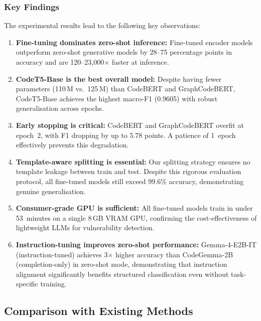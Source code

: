 \documentclass[conference]{IEEEtran}
\begin{document}
\subsubsection{Key Findings}
The experimental results lead to the following key observations:
\begin{enumerate}
    \item \textbf{Fine-tuning dominates zero-shot inference:}
          Fine-tuned encoder models outperform zero-shot generative models by
          28--75 percentage points in accuracy and are 120--23,000$\times$
          faster at inference.
    \item \textbf{CodeT5-Base is the best overall model:}
          Despite having fewer parameters (110\,M vs.\ 125\,M) than
          CodeBERT and GraphCodeBERT, CodeT5-Base achieves the highest
          macro-F1 (0.9605) with robust generalisation across epochs.
    \item \textbf{Early stopping is critical:}
          CodeBERT and GraphCodeBERT overfit at epoch~2, with F1 dropping by
          up to 5.78 points.  A patience of 1~epoch effectively prevents
          this degradation.
    \item \textbf{Template-aware splitting is essential:}
          Our splitting strategy ensures no template leakage between train
          and test.  Despite this rigorous evaluation protocol, all
          fine-tuned models still exceed 99.6\% accuracy, demonstrating
          genuine generalisation.
    \item \textbf{Consumer-grade GPU is sufficient:}
          All fine-tuned models train in under 53~minutes on a single 8\,GB
          VRAM GPU, confirming the cost-effectiveness of lightweight LLMs
          for vulnerability detection.
    \item \textbf{Instruction-tuning improves zero-shot performance:}
          Gemma-4-E2B-IT (instruction-tuned) achieves 3$\times$ higher
          accuracy than CodeGemma-2B (completion-only) in zero-shot mode,
          demonstrating that instruction alignment significantly benefits
          structured classification even without task-specific training.
\end{enumerate}

\subsection{Comparison with Existing Methods}
\label{sec:comparison}
\end{document}
